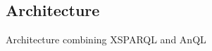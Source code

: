 
\subsection{Architecture}


\begin{frame}{Architecture combining XSPARQL and AnQL}

  \begin{center}
    
  \end{center}

\end{frame}




